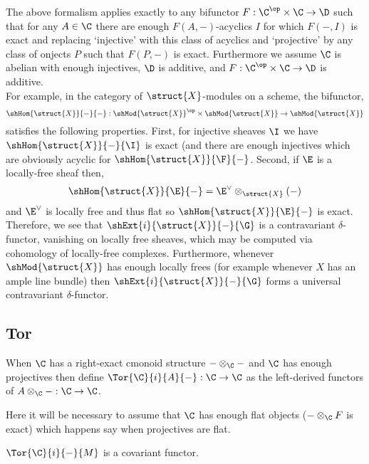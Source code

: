 \documentclass[12pt]{article}
\begin{document}
\begin{rmk}
The above formalism applies exactly to any bifunctor $F : \C^\op \times \C \to \D$ such that for any $A \in \C$ there are enough $F(A, -)$-acyclics $I$ for which $F(-,I)$ is exact and replacing `injective' with this class of acyclics and `projective' by any class of onjects $P$ such that $F(P, -)$ is exact. Furthermore we assume $\C$ is abelian with enough injectives, $\D$ is additive, and $F : \C^\op \times \C \to \D$ is additive. 
\bigskip\\
For example, in the category of $\struct{X}$-modules on a scheme, the bifunctor,
\[ \shHom{\struct{X}}{-}{-} : \shMod{\struct{X}}^\op \times \shMod{\struct{X}} \to \shMod{\struct{X}} \] satisfies the following properties. First, for injective sheaves $\I$ we have $\shHom{\struct{X}}{-}{\I}$ is exact (and there are enough injectives which are obviously acyclic for $\shHom{\struct{X}}{\F}{-}$. Second, if $\E$ is a locally-free sheaf then,
\[ \shHom{\struct{X}}{\E}{-} = \E^\vee \otimes_{\struct{X}} (-) \]
and $\E^\vee$ is locally free and thus flat so $\shHom{\struct{X}}{\E}{-}$ is exact. Therefore, we see that $\shExt{i}{\struct{X}}{-}{\G}$ is a contravariant $\delta$-functor, vanishing on locally free sheaves, which may be computed via cohomology of locally-free complexes. Furthermore, whenever $\shMod{\struct{X}}$ has enough locally frees (for example whenever $X$ has an ample line bundle) then $\shExt{i}{\struct{X}}{-}{\G}$ forms a universal contravariant $\delta$-functor.
\end{rmk}

\subsection{Tor}

\begin{defn}
When $\C$ has a right-exact cmonoid structure $- \otimes_\C -$ and $\C$ has enough projectives then define $\Tor{\C}{i}{A}{-} : \C \to \C$ as the left-derived functors of $A \otimes_\C - : \C \to \C$. 
\end{defn}

\begin{rmk}
Here it will be necessary to assume that $\C$ has enough flat objects ($- \otimes_\C F$ is exact) which happens say when projectives are flat. 
\end{rmk}

\begin{lemma}
$\Tor{\C}{i}{-}{M}$ is a covariant functor.
\end{lemma}
\end{document}
